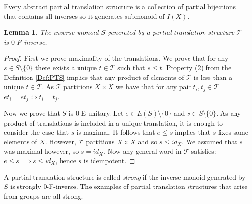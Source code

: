 \documentclass[11pt,a4paper]{amsart}
\theoremstyle{plain}
\newtheorem{lemma}[theorem]{Lemma}%
\theoremstyle{definition}%
\theoremstyle{remark}%
\begin{document}
Every abstract partial translation structure is a collection of partial bijections that contains all inverses so it generates submonoid of $I(X)$.

\begin{lemma}
The inverse monoid $S$ generated by a partial translation structure $\mathcal{T}$ is $0$-F-inverse. 
\end{lemma}
\begin{proof}
First we prove maximality of the translations. We prove that for any $s\in S \setminus \lbrace 0 \rbrace$ there exists a unique $t \in \mathcal{T}$ such that $s \leq t$. Property (2) from the Definition \ref{Def:PTS} implies that any product of elements of $\mathcal{T}$ is less than a unique $t \in \mathcal{T}$. As $\mathcal{T}$ partitions $X \times X$ we have that for any pair $t_{i},t_{j}\in \mathcal{T}$ $et_{i}=et_{j} \Leftrightarrow t_{i}=t_{j}$. 

Now we prove that $S$ is $0$-E-unitary. Let $e\in E(S)\setminus \lbrace 0 \rbrace$ and $s\in S\setminus \lbrace 0 \rbrace$. As any product of translations is included in a unique translation, it is enough to consider the case that $s$ is maximal. It follows that $e \leq s$ implies that $s$ fixes some elements of $X$. However, $\mathcal{T}$ partitions $X \times X$ and so $s \leq id_{X}$. We assumed that $s$ was maximal however, so $s = id_{X}$. Now any general word in $\mathcal{T}$ satisfies: $e \leq s \implies s \leq id_{X}$, hence $s$ is idempotent.  
\end{proof}

A partial translation structure is called \textit{strong} if the inverse monoid generated by $S$ is strongly $0$-F-inverse. The examples of partial translation structures that arise from groups are all strong.
\end{document}
